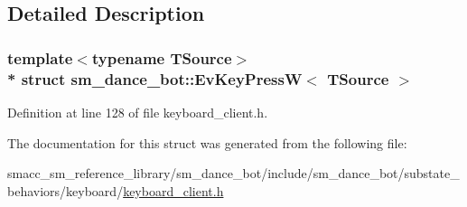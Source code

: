 \subsection{Detailed Description}
\subsubsection*{template$<$typename T\+Source$>$\\*
struct sm\+\_\+dance\+\_\+bot\+::\+Ev\+Key\+Press\+W$<$ T\+Source $>$}



Definition at line 128 of file keyboard\+\_\+client.\+h.



The documentation for this struct was generated from the following file\+:\begin{DoxyCompactItemize}
\item 
smacc\+\_\+sm\+\_\+reference\+\_\+library/sm\+\_\+dance\+\_\+bot/include/sm\+\_\+dance\+\_\+bot/substate\+\_\+behaviors/keyboard/\hyperlink{keyboard__client_8h}{keyboard\+\_\+client.\+h}\end{DoxyCompactItemize}
